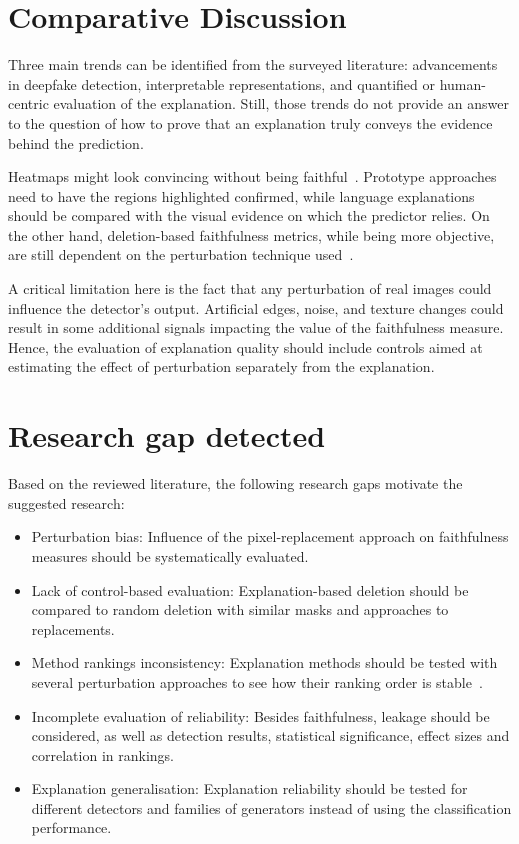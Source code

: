 \documentclass[12pt,a4wide]{report}
\theoremstyle{plain}
\theoremstyle{definition}
\theoremstyle{remark}
\begin{document}
\section{Comparative Discussion}
\label{sec:xai-deepfake}

Three main trends can be identified from the surveyed literature: advancements in deepfake detection, interpretable representations, and quantified or human-centric evaluation of the explanation. Still, those trends do not provide an answer to the question of how to prove that an explanation truly conveys the evidence behind the prediction.

Heatmaps might look convincing without being faithful~\cite{adebayo2018sanity}. Prototype approaches need to have the regions highlighted confirmed, while language explanations should be compared with the visual evidence on which the predictor relies. On the other hand, deletion-based faithfulness metrics, while being more objective, are still dependent on the perturbation technique used~\cite{hooker2019roar, rong2022road}.

A critical limitation here is the fact that any perturbation of real images could influence the detector’s output. Artificial edges, noise, and texture changes could result in some additional signals impacting the value of the faithfulness measure. Hence, the evaluation of explanation quality should include controls aimed at estimating the effect of perturbation separately from the explanation.


\section{Research gap detected}
\label{sec:gap}

Based on the reviewed literature, the following research gaps motivate the suggested research:

\begin{itemize}
    \item Perturbation bias: Influence of the pixel-replacement approach on faithfulness measures should be systematically evaluated.

    \item  Lack of control-based evaluation: Explanation-based deletion should be compared to random deletion with similar masks and approaches to replacements.

    \item Method rankings inconsistency: Explanation methods should be tested with several perturbation approaches to see how their ranking order is stable~\cite{tomsett2020sanity}.

    \item Incomplete evaluation of reliability: Besides faithfulness, leakage should be considered, as well as detection results, statistical significance, effect sizes and correlation in rankings.

    \item  Explanation generalisation: Explanation reliability should be tested for different detectors and families of generators instead of using the classification performance.


\end{itemize}
\end{document}

